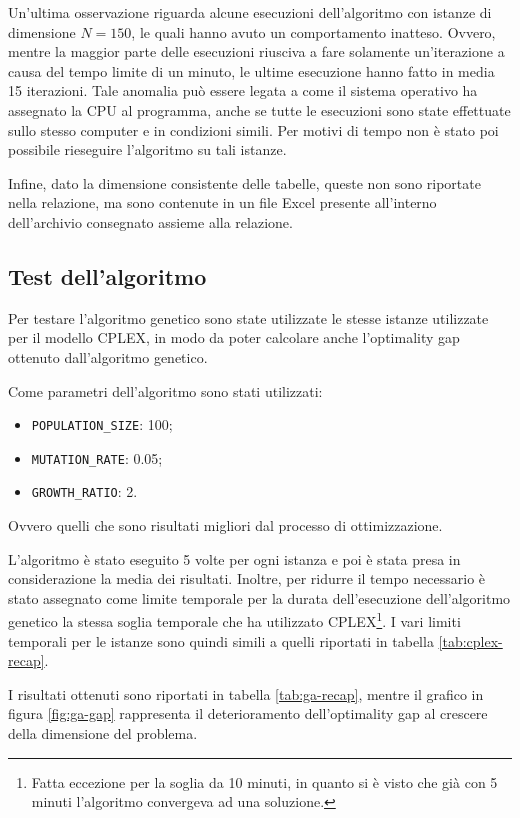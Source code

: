Un'ultima osservazione riguarda alcune esecuzioni dell'algoritmo con istanze di dimensione $N=150$, le quali hanno avuto un comportamento inatteso. 
Ovvero, mentre la maggior parte delle esecuzioni riusciva a fare solamente un'iterazione a causa del tempo limite di un minuto, le ultime esecuzione hanno fatto in media 15 iterazioni. Tale anomalia può essere legata a come il sistema operativo ha assegnato la CPU al programma, anche se tutte le esecuzioni sono state effettuate sullo stesso computer e in condizioni simili. Per motivi di tempo non è stato poi possibile rieseguire l'algoritmo su tali istanze.

Infine, dato la dimensione consistente delle tabelle, queste non sono riportate nella relazione, ma sono contenute in un file Excel presente all'interno dell'archivio consegnato assieme alla relazione.

\subsection{Test dell'algoritmo}

Per testare l'algoritmo genetico sono state utilizzate le stesse istanze utilizzate per il modello CPLEX, in modo da poter calcolare anche l'optimality gap ottenuto dall'algoritmo genetico.

Come parametri dell'algoritmo sono stati utilizzati:

\begin{itemize}
	\item \texttt{POPULATION\_SIZE}: 100;
	\item \texttt{MUTATION\_RATE}: 0.05;
	\item \texttt{GROWTH\_RATIO}: 2.
\end{itemize}

\noindent Ovvero quelli che sono risultati migliori dal processo di ottimizzazione.

L'algoritmo è stato eseguito 5 volte per ogni istanza e poi è stata presa in considerazione la media dei risultati. 
Inoltre, per ridurre il tempo necessario è stato assegnato come limite temporale per la durata dell'esecuzione dell'algoritmo genetico la stessa soglia temporale che ha utilizzato CPLEX\footnote{Fatta eccezione per la soglia da 10 minuti, in quanto si è visto che già con 5 minuti l'algoritmo convergeva ad una soluzione.}.
I vari limiti temporali per le istanze sono quindi simili a quelli riportati in tabella \ref{tab:cplex-recap}.

I risultati ottenuti sono riportati in tabella \ref{tab:ga-recap}, mentre il grafico in figura \ref{fig:ga-gap} rappresenta il deterioramento dell'optimality gap al crescere della dimensione del problema.

